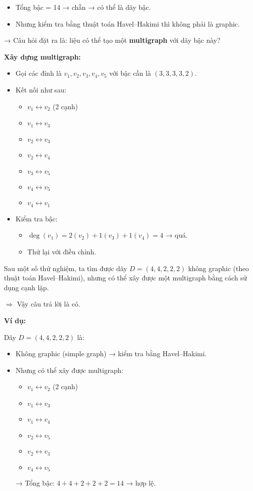 \documentclass{article}
\begin{document}
	\begin{itemize}
		\item Tổng bậc = 14 → chẵn → có thể là dãy bậc.
		\item Nhưng kiểm tra bằng thuật toán Havel–Hakimi thì không phải là graphic.
	\end{itemize}
	
	→ Câu hỏi đặt ra là: liệu có thể tạo một \textbf{multigraph} với dãy bậc này?
	
	\textbf{Xây dựng multigraph:}
	
	\begin{itemize}
		\item Gọi các đỉnh là $v_1, v_2, v_3, v_4, v_5$ với bậc cần là $(3,3,3,3,2)$.
		\item Kết nối như sau:
		\begin{itemize}
			\item $v_1 \leftrightarrow v_2$ (2 cạnh)
			\item $v_1 \leftrightarrow v_3$
			\item $v_2 \leftrightarrow v_3$
			\item $v_2 \leftrightarrow v_4$
			\item $v_3 \leftrightarrow v_5$
			\item $v_4 \leftrightarrow v_5$
			\item $v_4 \leftrightarrow v_1$
		\end{itemize}
		\item Kiểm tra bậc:
		\begin{itemize}
			\item $\deg(v_1) = 2 (v_2) + 1 (v_3) + 1 (v_4) = 4$ → quá.
			\item Thử lại với điều chỉnh.
		\end{itemize}
	\end{itemize}
	
	Sau một số thử nghiệm, ta tìm được dãy $D = (4, 4, 2, 2, 2)$ không graphic (theo thuật toán Havel–Hakimi), nhưng có thể xây được một multigraph bằng cách sử dụng cạnh lặp.
	
	$\Rightarrow$ Vậy câu trả lời là có.
	
	\textbf{Ví dụ:}
	
	Dãy $D = (4, 4, 2, 2, 2)$ là:
	\begin{itemize}
		\item Không graphic (simple graph) → kiểm tra bằng Havel–Hakimi.
		\item Nhưng có thể xây được multigraph:
		\begin{itemize}
			\item $v_1 \leftrightarrow v_2$ (2 cạnh)
			\item $v_1 \leftrightarrow v_3$
			\item $v_1 \leftrightarrow v_4$
			\item $v_2 \leftrightarrow v_5$
			\item $v_2 \leftrightarrow v_3$
			\item $v_4 \leftrightarrow v_5$
		\end{itemize}
		→ Tổng bậc: $4 + 4 + 2 + 2 + 2 = 14$ → hợp lệ.
	\end{itemize}
	
\end{document}
